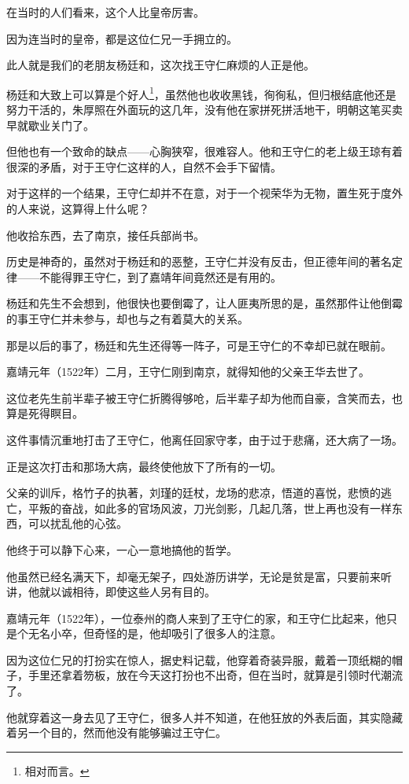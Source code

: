 \begin{multicols}{\theparacolNo}
		在当时的人们看来，这个人比皇帝厉害。

		因为连当时的皇帝，都是这位仁兄一手拥立的。

		此人就是我们的老朋友杨廷和，这次找王守仁麻烦的人正是他。

		杨廷和大致上可以算是个好人\footnote{相对而言。}，虽然他也收收黑钱，徇徇私，但归根结底他还是努力干活的，朱厚照在外面玩的这几年，没有他在家拼死拼活地干，明朝这笔买卖早就歇业关门了。

		但他也有一个致命的缺点——心胸狭窄，很难容人。他和王守仁的老上级王琼有着很深的矛盾，对于王守仁这样的人，自然不会手下留情。

		对于这样的一个结果，王守仁却并不在意，对于一个视荣华为无物，置生死于度外的人来说，这算得上什么呢？

		他收拾东西，去了南京，接任兵部尚书。

		历史是神奇的，虽然对于杨廷和的恶整，王守仁并没有反击，但正德年间的著名定律——不能得罪王守仁，到了嘉靖年间竟然还是有用的。

		杨廷和先生不会想到，他很快也要倒霉了，让人匪夷所思的是，虽然那件让他倒霉的事王守仁并未参与，却也与之有着莫大的关系。

		那是以后的事了，杨廷和先生还得等一阵子，可是王守仁的不幸却已就在眼前。

		嘉靖元年（1522年）二月，王守仁刚到南京，就得知他的父亲王华去世了。

		这位老先生前半辈子被王守仁折腾得够呛，后半辈子却为他而自豪，含笑而去，也算是死得瞑目。

		这件事情沉重地打击了王守仁，他离任回家守孝，由于过于悲痛，还大病了一场。

		正是这次打击和那场大病，最终使他放下了所有的一切。

		父亲的训斥，格竹子的执著，刘瑾的廷杖，龙场的悲凉，悟道的喜悦，悲愤的逃亡，平叛的奋战，如此多的官场风波，刀光剑影，几起几落，世上再也没有一样东西，可以扰乱他的心弦。

		他终于可以静下心来，一心一意地搞他的哲学。

		他虽然已经名满天下，却毫无架子，四处游历讲学，无论是贫是富，只要前来听讲，他就以诚相待，即使这些人另有目的。

		嘉靖元年（1522年），一位泰州的商人来到了王守仁的家，和王守仁比起来，他只是个无名小卒，但奇怪的是，他却吸引了很多人的注意。

		因为这位仁兄的打扮实在惊人，据史料记载，他穿着奇装异服，戴着一顶纸糊的帽子，手里还拿着笏板，放在今天这打扮也不出奇，但在当时，就算是引领时代潮流了。

		他就穿着这一身去见了王守仁，很多人并不知道，在他狂放的外表后面，其实隐藏着另一个目的，然而他没有能够骗过王守仁。


\end{multicols}
